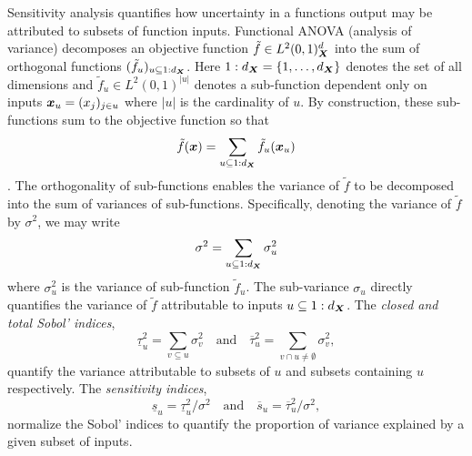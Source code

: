 \documentclass{article}[12pt]
\begin{document}
Sensitivity analysis quantifies how uncertainty in a functions output may be attributed to subsets of function inputs. Functional ANOVA (analysis of variance) decomposes an objective function $\tilde{f} \in L^2(0,1)^d_{\boldsymbol{X}}$ into the sum of orthogonal functions $(\tilde{f}_u)_{u \subseteq 1:d_{\boldsymbol{X}}}$. Here $1:d_{\boldsymbol{X}}=\{1,\dots,d_{\boldsymbol{X}}\}$ denotes the set of all dimensions and $\tilde{f}_u \in L^2(0,1)^{\lvert u \rvert}$ denotes a sub-function dependent only on inputs $\boldsymbol{x}_u = (x_j)_{j \in u}$ where $\lvert u \rvert$ is the cardinality of $u$. By construction, these sub-functions sum to the objective function so that
\begin{equation}
    \tilde{f}(\boldsymbol{x}) = \sum_{u \subseteq 1:d_{\boldsymbol{X}}} \tilde{f}_u(\boldsymbol{x}_u) \label{eq:fanova}
\end{equation}
\cite[Appendix A]{mcbook}. The orthogonality of sub-functions enables the variance of $\tilde{f}$ to be decomposed into the sum of variances of sub-functions. Specifically, denoting the variance of $\tilde{f}$ by $\sigma^2$, we may write
\begin{equation*}
    \sigma^2 = \sum_{u \subseteq 1:d_{\boldsymbol{X}}} \sigma^2_u
\end{equation*}
where $\sigma^2_u$ is the variance of sub-function $\tilde{f}_u$. The sub-variance $\sigma_u$ directly quantifies the variance of $\tilde{f}$ attributable to inputs $u \subseteq 1:d_{\boldsymbol{X}}$.  The \emph{closed and total Sobol' indices},
\begin{equation}
    \label{eq:sobol_indices}
    \underline{\tau}_u^2 = \sum_{v \subseteq u} \sigma^2_v \quad \text{and} \quad 
    \overline{\tau}_u^2 = \sum_{v \cap u \neq \emptyset} \sigma^2_v,
\end{equation}
quantify the variance attributable to subsets of $u$ and subsets containing $u$ respectively. The \emph{sensitivity indices},
\begin{equation}
    \label{eq:sensitivity_indices_og}
    \underline{s}_u = \underline{\tau}_u^2/\sigma^2 \quad \text{and} \quad 
    \overline{s}_u = \overline{\tau}_u^2/\sigma^2,
\end{equation}
normalize the Sobol' indices to quantify the proportion of variance explained by a given subset of inputs. 
\end{document}
